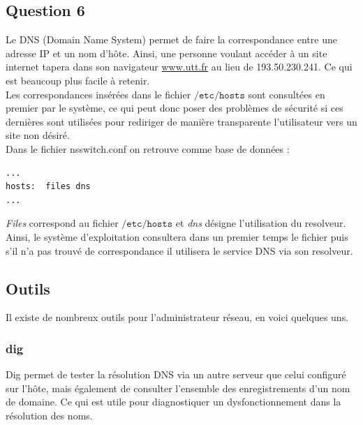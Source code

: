 \documentclass[a4paper,12pt]{article}
\begin{document}
\subsection{Question 6}
Le DNS (Domain Name System) permet de faire la correspondance entre une adresse IP et un nom d'hôte. Ainsi, une personne voulant accéder à un site internet tapera dans son navigateur \url{www.utt.fr} au lieu de 193.50.230.241. Ce qui est beaucoup plus facile à retenir.\\


Les correspondances insérées dans le fichier $\mathtt{/etc/hosts}$ sont consultées en premier par le système, ce qui peut donc poser des problèmes de sécurité si ces dernières sont utilisées pour rediriger de manière transparente l'utilisateur vers un site non désiré.\\

\noindent Dans le fichier nsswitch.conf on retrouve comme base de données :

{\footnotesize \begin{verbatim}
...
hosts:	files dns
...
\end{verbatim}}

\emph{Files} correspond au fichier $\mathtt{/etc/hosts}$ et \emph{dns} désigne l'utilisation du resolveur. Ainsi, le système d'exploitation consultera dans un premier temps le fichier puis s'il n'a pas trouvé de correspondance il utilisera le service DNS via son resolveur.

\subsection{Outils}
Il existe de nombreux outils pour l'administrateur réseau, en voici quelques uns.
\subsubsection{dig}

Dig permet de tester la résolution DNS via un autre serveur que celui configuré sur l'hôte, mais également de consulter l'ensemble des enregistrements d'un nom de domaine. Ce qui est utile pour diagnostiquer un dysfonctionnement dans la résolution des noms.\\
\end{document}
